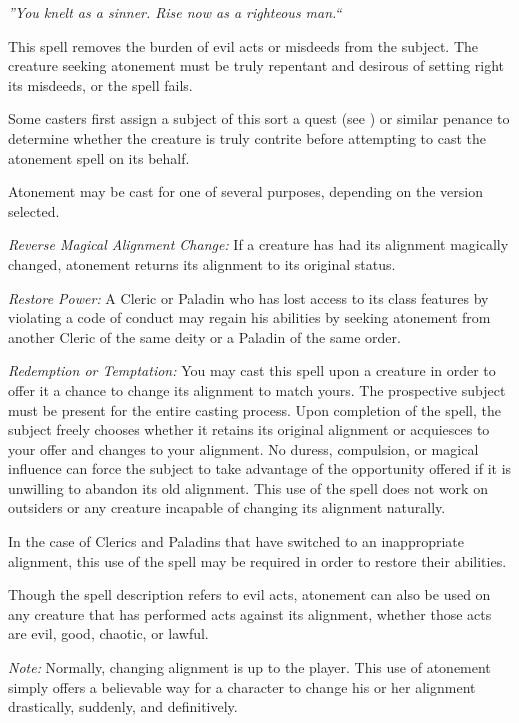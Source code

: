 \emph{''You knelt as a sinner. Rise now as a righteous man.``}

This spell removes the burden of evil acts or misdeeds from the subject. 
The creature seeking atonement must be truly repentant and desirous of setting right its misdeeds, or the spell fails.

Some casters first assign a subject of this sort a quest (see ) or similar penance to determine whether the creature is truly contrite 
before attempting to cast the atonement spell on its behalf.

Atonement may be cast for one of several purposes, depending on the version selected.
\begin{list}{}{\leftmargin=1em}
\item \emph{Reverse Magical Alignment Change:}
If a creature has had its alignment magically changed, atonement returns its alignment to its original status.
\item \emph{Restore Power:}
A Cleric or Paladin who has lost access to its class features by violating a code of conduct may regain his abilities by seeking atonement 
from another Cleric of the same deity or a Paladin of the same order.
\item \emph{Redemption or Temptation:}
You may cast this spell upon a creature in order to offer it a chance to change its alignment to match yours. 
The prospective subject must be present for the entire casting process. Upon completion of the spell, 
the subject freely chooses whether it retains its original alignment or acquiesces to your offer and changes to your alignment. 
No duress, compulsion, or magical influence can force the subject to take advantage of the opportunity offered if it is unwilling to abandon its old alignment. 
This use of the spell does not work on outsiders or any creature incapable of changing its alignment naturally.

In the case of Clerics and Paladins that have switched to an inappropriate alignment, this use of the spell may be required in order to restore their abilities.
\end{list}

Though the spell description refers to evil acts, 
atonement can also be used on any creature that has performed acts against its alignment, whether those acts are evil, good, chaotic, or lawful.

\emph{Note:} Normally, changing alignment is up to the player. 
This use of atonement simply offers a believable way for a character to change his or her alignment drastically, suddenly, and definitively.
 
